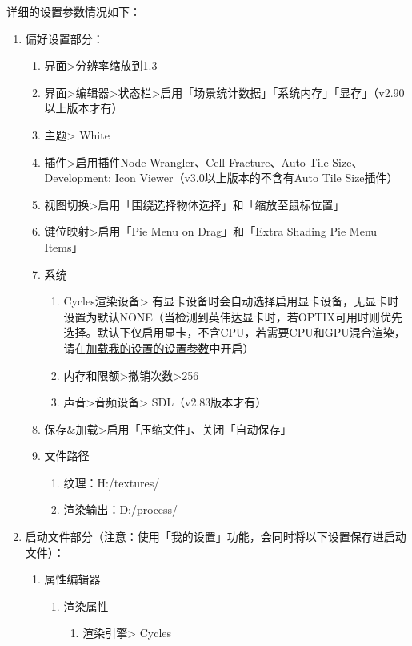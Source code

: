 \documentclass{../../public_resources/doc}
\begin{document}
详细的设置参数情况如下：
\begin{enumerate}
    \item 偏好设置部分：
    \begin{enumerate}
        \item 界面>分辨率缩放到1.3
        \item 界面>编辑器>状态栏>启用「场景统计数据」「系统内存」「显存」（v2.90以上版本才有）
        \item 主题> White
        \item 插件>启用插件Node Wrangler、Cell Fracture、Auto Tile Size、Development: Icon Viewer（v3.0以上版本的不含有Auto Tile Size插件）
        \item 视图切换>启用「围绕选择物体选择」和「缩放至鼠标位置」
        \item 键位映射>启用「Pie Menu on Drag」和「Extra Shading Pie Menu Items」
        \item 系统
        \begin{enumerate}
            \item Cycles渲染设备> 有显卡设备时会自动选择启用显卡设备，无显卡时设置为默认NONE（当检测到英伟达显卡时，若OPTIX可用时则优先选择。默认下仅启用显卡，不含CPU，若需要CPU和GPU混合渲染，请在\hyperlink{加载我的设置小节}{加载我的设置的设置参数}中开启）
            \item 内存和限额>撤销次数>256
            \item 声音>音频设备> SDL（v2.83版本才有）
        \end{enumerate}
        \item 保存\&加载>启用「压缩文件」、关闭「自动保存」
        \item 文件路径
        \begin{enumerate}
            \item 纹理：H:/textures/
            \item 渲染输出：D:/process/
        \end{enumerate}
    \end{enumerate}
    \item 启动文件部分（注意：使用「我的设置」功能，会同时将以下设置保存进启动文件）：
    \begin{enumerate}
        \item 属性编辑器
        \begin{enumerate}
            \item 渲染属性
            \begin{enumerate}
                \item 渲染引擎> Cycles

\end{enumerate}
\end{enumerate}
\end{enumerate}
\end{enumerate}
\end{document}
